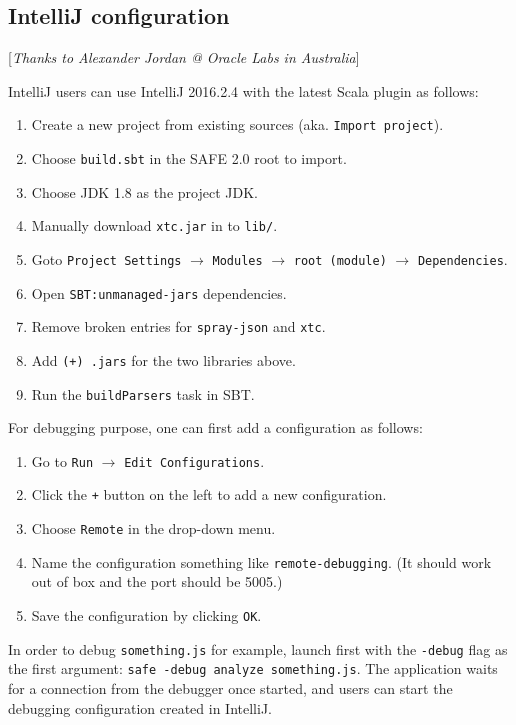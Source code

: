 \subsection{IntelliJ configuration}
[\emph{Thanks to Alexander Jordan @ Oracle Labs in Australia}]
\smallskip

IntelliJ users can use IntelliJ 2016.2.4 with the latest Scala plugin as follows:
\begin{enumerate}
\item Create a new project from existing sources (aka. \verb!Import project!).
\item Choose \verb!build.sbt! in the SAFE 2.0 root to import.
\item Choose JDK 1.8 as the project JDK.
\item Manually download \verb!xtc.jar! in to \verb!lib/!.
\item Goto \verb!Project Settings! $\rightarrow$ \verb!Modules! $\rightarrow$
\verb!root (module)! $\rightarrow$ \verb!Dependencies!.
\item Open \verb!SBT:unmanaged-jars! dependencies.
\item Remove broken entries for \verb!spray-json! and \verb!xtc!.
\item Add \verb!(+) .jars! for the two libraries above.
\item Run the \verb!buildParsers! task in SBT.
\end{enumerate}

\smallskip

For debugging purpose, one can first add a configuration as follows:

\begin{enumerate}
\item Go to \verb!Run! $\rightarrow$ \verb!Edit Configurations!.
\item Click the \verb!+! button on the left to add a new configuration.
\item Choose \verb!Remote! in the drop-down menu.
\item Name the configuration something like \verb!remote-debugging!.
(It should work out of box and the port should be 5005.)
\item Save the configuration by clicking \verb!OK!.
\end{enumerate}

In order to debug \verb!something.js! for example,
launch \safe first with the \verb!-debug! flag as the first argument:
\verb!safe -debug analyze something.js!.
The application waits for a connection from the debugger once started,
and users can start the debugging configuration created in IntelliJ.